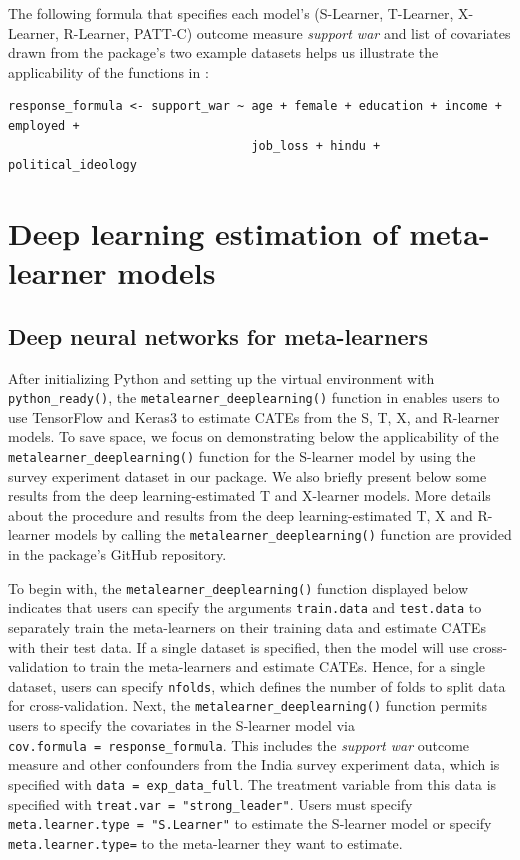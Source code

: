 The following formula that specifies each model's (S-Learner, T-Learner,
X-Learner, R-Learner, PATT-C) outcome measure \emph{support war} and list of
covariates drawn from the package's two example datasets helps us
illustrate the applicability of the functions in
:

\begin{verbatim}
response_formula <- support_war ~ age + female + education + income + employed + 
                                  job_loss + hindu + political_ideology
\end{verbatim}

\section{Deep learning estimation of meta-learner models}\label{deep-learning-estimation-of-meta-learner-models}

\subsection{Deep neural networks for meta-learners}\label{deep-neural-networks-for-meta-learners}

After initializing Python and setting up the virtual environment with
\texttt{python\_ready()}, the \texttt{metalearner\_deeplearning()} function in
 enables users to use TensorFlow and Keras3 to
estimate CATEs from the S, T, X, and R-learner models. To save space, we
focus on demonstrating below the applicability of the
\texttt{metalearner\_deeplearning()} function for the S-learner model by using
the survey experiment dataset in our package. We also briefly present
below some results from the deep learning-estimated T and X-learner
models. More details about the procedure and results from the deep
learning-estimated T, X and R-learner models by calling the
\texttt{metalearner\_deeplearning()} function are provided in the package's
GitHub repository.

To begin with, the \texttt{metalearner\_deeplearning()} function displayed below
indicates that users can specify the arguments \texttt{train.data} and
\texttt{test.data} to separately train the meta-learners on their training data
and estimate CATEs with their test data. If a single dataset is
specified, then the model will use cross-validation to train the
meta-learners and estimate CATEs. Hence, for a single dataset, users can
specify \texttt{nfolds}, which defines the number of folds to split data for
cross-validation. Next, the \texttt{metalearner\_deeplearning()} function
permits users to specify the covariates in the S-learner model via
\texttt{cov.formula\ =\ response\_formula}. This includes the \emph{support war}
outcome measure and other confounders from the India survey experiment
data, which is specified with \texttt{data\ =\ exp\_data\_full}. The treatment
variable from this data is specified with \texttt{treat.var\ =\ "strong\_leader"}.
Users must specify \texttt{meta.learner.type\ =\ "S.Learner"} to estimate the
S-learner model or specify \texttt{meta.learner.type=} to the meta-learner they
want to estimate.

